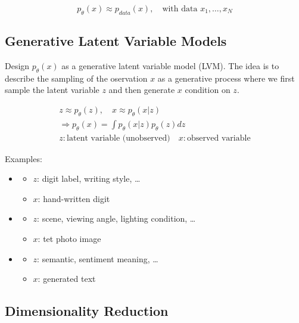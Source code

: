 \documentclass[11pt]{article}
\begin{document}
\begin{equation}
    p_\theta(x)\approx p_{data}(x), \quad \text{with data } x_1, \dots, x_N
\end{equation}

\subsection{Generative \textbf{Latent} Variable Models}\label{sect:Generative Latent Variable Models}

Design $p_\theta(x)$ as a generative latent variable model (LVM). The idea is to describe the sampling of the oservation $x$ as a generative process where we first sample the latent variable $z$ and then generate $x$ condition on $z$.

\begin{gather}
    z \approx p_\theta(z), \quad x \approx p_\theta(x|z) \\
    \Rightarrow p_\theta(x) = \int p_\theta(x|z)p_\theta(z)dz \\
    \nonumber z: \text{latent variable (unobserved)} \quad x: \text{observed variable}
\end{gather}

Examples:

\begin{itemize}
    \item \begin{itemize}
              \item $z$: digit label, writing style, \dots
              \item $x$: hand-written digit
          \end{itemize}
    \item \begin{itemize}
              \item $z$: scene, viewing angle, lighting condition, \dots
              \item $x$: tet photo image
          \end{itemize}
    \item \begin{itemize}
              \item $z$: semantic, sentiment meaning, \dots
              \item $x$: generated text
          \end{itemize}
\end{itemize}

\subsection{Dimensionality Reduction}\label{sect:Dimensionality Reduction}
\end{document}
